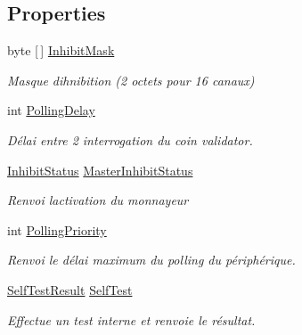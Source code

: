 \subsection*{Properties}
\begin{DoxyCompactItemize}
\item 
byte \mbox{[}$\,$\mbox{]} \mbox{\hyperlink{class_device_library_1_1_ccash_reader_a566a8b5bf9b1f377c5439f06a6d58178}{Inhibit\+Mask}}
\begin{DoxyCompactList}\small\item\em Masque d\textquotesingle{}ihnibition (2 octets pour 16 canaux) \end{DoxyCompactList}\item 
int \mbox{\hyperlink{class_device_library_1_1_ccash_reader_a5378d4373a02c46261c7f611af60a89c}{Polling\+Delay}}
\begin{DoxyCompactList}\small\item\em Délai entre 2 interrogation du coin validator. \end{DoxyCompactList}\item 
\mbox{\hyperlink{class_device_library_1_1_ccash_reader_a789dcffa38ad9d646e32c448632ceaff}{Inhibit\+Status}} \mbox{\hyperlink{class_device_library_1_1_ccash_reader_ad6efa8899adedbb445d7f7cb4af0c159}{Master\+Inhibit\+Status}}
\begin{DoxyCompactList}\small\item\em Renvoi l\textquotesingle{}activation du monnayeur \end{DoxyCompactList}\item 
int \mbox{\hyperlink{class_device_library_1_1_ccash_reader_a1768cb2711e0f8d8fd45d9d28aeb1cf6}{Polling\+Priority}}
\begin{DoxyCompactList}\small\item\em Renvoi le délai maximum du polling du périphérique. \end{DoxyCompactList}\item 
\mbox{\hyperlink{group___erreur_ga179570d2d8f6f95d52ccafb98d20c790}{Self\+Test\+Result}} \mbox{\hyperlink{class_device_library_1_1_ccash_reader_a40798e7b17783bffe4d59b67ef57a430}{Self\+Test}}
\begin{DoxyCompactList}\small\item\em Effectue un test interne et renvoie le résultat. \end{DoxyCompactList}\end{DoxyCompactItemize}
